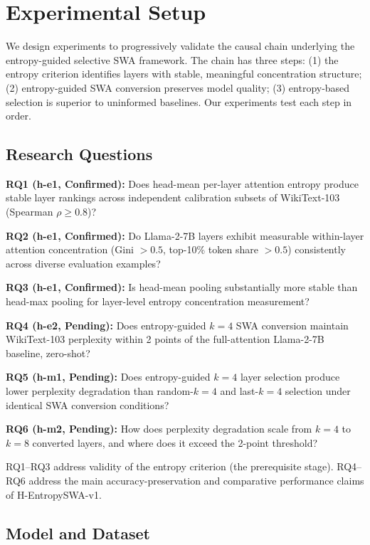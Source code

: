 \section{Experimental Setup}
\label{sec:experiments}

We design experiments to progressively validate the causal chain underlying the entropy-guided selective SWA framework. The chain has three steps: (1) the entropy criterion identifies layers with stable, meaningful concentration structure; (2) entropy-guided SWA conversion preserves model quality; (3) entropy-based selection is superior to uninformed baselines. Our experiments test each step in order.

\subsection{Research Questions}

\textbf{RQ1 (h-e1, Confirmed):} Does head-mean per-layer attention entropy produce stable layer rankings across independent calibration subsets of WikiText-103 (Spearman $\rho \geq 0.8$)?

\textbf{RQ2 (h-e1, Confirmed):} Do Llama-2-7B layers exhibit measurable within-layer attention concentration (Gini $> 0.5$, top-10\% token share $> 0.5$) consistently across diverse evaluation examples?

\textbf{RQ3 (h-e1, Confirmed):} Is head-mean pooling substantially more stable than head-max pooling for layer-level entropy concentration measurement?

\textbf{RQ4 (h-e2, Pending):} Does entropy-guided $k=4$ SWA conversion maintain WikiText-103 perplexity within 2 points of the full-attention Llama-2-7B baseline, zero-shot?

\textbf{RQ5 (h-m1, Pending):} Does entropy-guided $k=4$ layer selection produce lower perplexity degradation than random-$k=4$ and last-$k=4$ selection under identical SWA conversion conditions?

\textbf{RQ6 (h-m2, Pending):} How does perplexity degradation scale from $k=4$ to $k=8$ converted layers, and where does it exceed the 2-point threshold?

RQ1--RQ3 address validity of the entropy criterion (the prerequisite stage). RQ4--RQ6 address the main accuracy-preservation and comparative performance claims of H-EntropySWA-v1.

\subsection{Model and Dataset}

